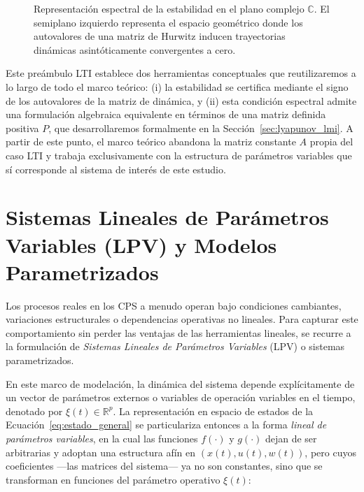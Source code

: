 \begin{figure}[ht]
\begin{subfigure}{\textwidth}
    \end{subfigure}
    \caption{Representación espectral de la estabilidad en el plano complejo $\mathbb{C}$. El semiplano izquierdo representa el espacio geométrico donde los autovalores de una matriz de Hurwitz inducen trayectorias dinámicas asintóticamente convergentes a cero.}
    \label{fig:estabilidad_plano}
\end{figure}

Este preámbulo LTI establece dos herramientas conceptuales que reutilizaremos a lo largo de todo el marco teórico: (i) la estabilidad se certifica mediante el signo de los autovalores de la matriz de dinámica, y (ii) esta condición espectral admite una formulación algebraica equivalente en términos de una matriz definida positiva $P$, que desarrollaremos formalmente en la Sección~\ref{sec:lyapunov_lmi}. A partir de este punto, el marco teórico abandona la matriz constante $A$ propia del caso LTI y trabaja exclusivamente con la estructura de parámetros variables que sí corresponde al sistema de interés de este estudio.

\section{Sistemas Lineales de Parámetros Variables (LPV) y Modelos Parametrizados}
\label{sec:lpv}

Los procesos reales en los CPS a menudo operan bajo condiciones cambiantes, variaciones estructurales o dependencias operativas no lineales. Para capturar este comportamiento sin perder las ventajas de las herramientas lineales, se recurre a la formulación de \textit{Sistemas Lineales de Parámetros Variables} (LPV) o sistemas parametrizados.

En este marco de modelación, la dinámica del sistema depende explícitamente de un vector de parámetros externos o variables de operación variables en el tiempo, denotado por $\xi(t) \in \mathbb{R}^p$. La representación en espacio de estados de la Ecuación~\eqref{eq:estado_general} se particulariza entonces a la forma \textit{lineal de parámetros variables}, en la cual las funciones $f(\cdot)$ y $g(\cdot)$ dejan de ser arbitrarias y adoptan una estructura afín en $(x(t), u(t), w(t))$, pero cuyos coeficientes —las matrices del sistema— ya no son constantes, sino que se transforman en funciones del parámetro operativo $\xi(t)$:

